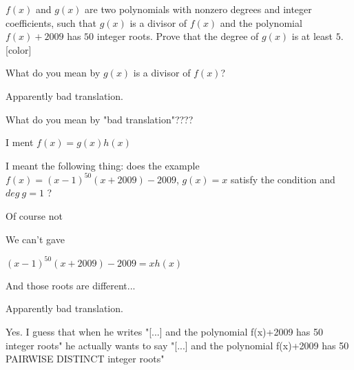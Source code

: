 \begin{solution}
	\begin{tcolorbox}[color=darkblue]$ f(x)$ and $ g(x)$ are two polynomials with nonzero degrees and integer coefficients, such that $ g(x)$ is a divisor of $ f(x)$ and the polynomial $ f(x) + 2009$ has $ 50$ integer roots. Prove that the degree of $ g(x)$ is at least $ 5$.[\/color]\end{tcolorbox}

What do you mean by $ g(x)$ is a divisor of $ f(x)$?
\end{solution}



\begin{solution}
	Apparently bad translation.
\end{solution}



\begin{solution}
	What do you mean by "bad translation"????

I ment $ f(x) = g(x)h(x)$
\end{solution}



\begin{solution}
	I meant the following thing:
 does the example $ f(x)=(x-1)^{50}(x+2009)-2009$, $ g(x)=x$ satisfy the condition and $ deg\ g=1$ ?
\end{solution}



\begin{solution}
	Of course not

We can't gave

$ (x-1)^{50}(x+2009)-2009=x h(x)$

And those roots are different...
\end{solution}



\begin{solution}
	\begin{tcolorbox}Apparently bad translation.\end{tcolorbox}
Yes.
I guess that when he writes "[...] and the polynomial f(x)+2009 has 50 integer roots"
he actually wants to say "[...] and the polynomial f(x)+2009 has 50 PAIRWISE DISTINCT integer roots"
\end{solution}



